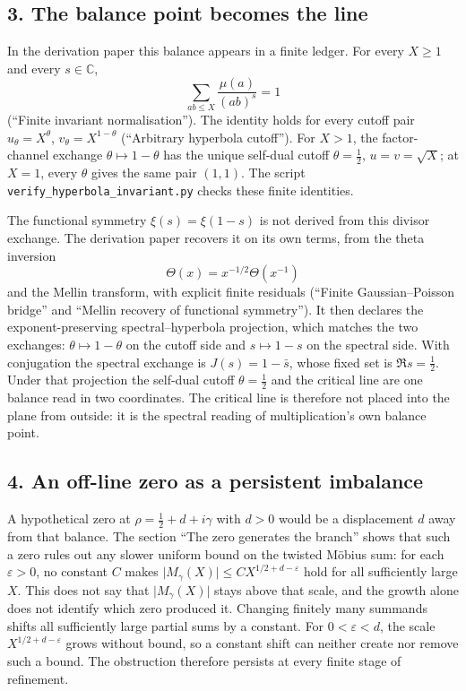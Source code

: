 \documentclass[11pt]{article}
\begin{document}
\subsection*{3. The balance point becomes the line}

In the derivation paper this balance appears in a finite ledger. For every \(X\ge1\) and every \(s\in\mathbb C\),
\[
\sum_{ab\le X}\frac{\mu(a)}{(ab)^s}=1
\]
(``Finite invariant normalisation''). The identity holds for every cutoff pair \(u_\theta=X^\theta\), \(v_\theta=X^{1-\theta}\) (``Arbitrary hyperbola cutoff''). For \(X>1\), the factor-channel exchange \(\theta\mapsto1-\theta\) has the unique self-dual cutoff \(\theta=\tfrac12\), \(u=v=\sqrt X\); at \(X=1\), every \(\theta\) gives the same pair \((1,1)\). The script \texttt{verify\_\allowbreak hyperbola\_\allowbreak invariant.py} checks these finite identities.

The functional symmetry \(\xi(s)=\xi(1-s)\) is not derived from this divisor exchange. The derivation paper recovers it on its own terms, from the theta inversion
\[
\Theta(x)=x^{-1/2}\Theta(x^{-1})
\]
and the Mellin transform, with explicit finite residuals (``Finite Gaussian--Poisson bridge'' and ``Mellin recovery of functional symmetry''). It then declares the exponent-preserving spectral--hyperbola projection, which matches the two exchanges: \(\theta\mapsto1-\theta\) on the cutoff side and \(s\mapsto1-s\) on the spectral side. With conjugation the spectral exchange is \(J(s)=1-\bar s\), whose fixed set is \(\Re s=\tfrac12\). Under that projection the self-dual cutoff \(\theta=\tfrac12\) and the critical line are one balance read in two coordinates. The critical line is therefore not placed into the plane from outside: it is the spectral reading of multiplication's own balance point.

\subsection*{4. An off-line zero as a persistent imbalance}

A hypothetical zero at \(\rho=\tfrac12+d+i\gamma\) with \(d>0\) would be a displacement \(d\) away from that balance. The section ``The zero generates the branch'' shows that such a zero rules out any slower uniform bound on the twisted M\"obius sum: for each \(\varepsilon>0\), no constant \(C\) makes \(\lvert M_\gamma(X)\rvert\le C X^{1/2+d-\varepsilon}\) hold for all sufficiently large \(X\). This does not say that \(\lvert M_\gamma(X)\rvert\) stays above that scale, and the growth alone does not identify which zero produced it. Changing finitely many summands shifts all sufficiently large partial sums by a constant. For \(0<\varepsilon<d\), the scale \(X^{1/2+d-\varepsilon}\) grows without bound, so a constant shift can neither create nor remove such a bound. The obstruction therefore persists at every finite stage of refinement.
\end{document}
